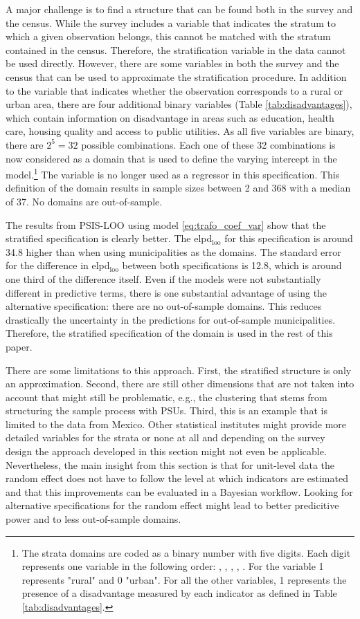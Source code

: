 A major challenge is to find a structure that can be found both in the survey and the census.
While the survey includes a variable that indicates the stratum to which a given observation belongs, this cannot be matched with the stratum contained in the census.
Therefore, the stratification variable in the data cannot be used directly.
However, there are some variables in both the survey and the census that can be used to approximate the stratification procedure.
In addition to the  variable that indicates whether the observation corresponds to a rural or urban area, there are four additional binary variables (Table \ref{tab:disadvantages}), which contain information on disadvantage in areas such as education, health care, housing quality and access to public utilities.
As all five variables are binary, there are $2^5 = 32$ possible combinations.
Each one of these 32 combinations is now considered as a domain that is used to define the varying intercept in the model.\footnote{The strata domains are coded as a binary number with five digits. Each digit represents one variable in the following order: , , , , . For the  variable 1 represents "rural" and 0 "urban". For all the other variables, 1 represents the presence of a disadvantage measured by each indicator as defined in Table \ref{tab:disadvantages}.}
The variable  is no longer used as a regressor in this specification.
This definition of the domain results in sample sizes between 2 and 368 with a median of 37.
No domains are out-of-sample.

The results from PSIS-LOO using model \ref{eq:trafo_coef_var} show that the stratified specification is clearly better. The elpd$_{\text{loo}}$ for this specification is around 34.8 higher than when using  municipalities as the domains.
The standard error for the difference in elpd$_{\text{loo}}$ between both specifications is 12.8, which is around one third of the difference itself.
Even if the models were not substantially different in predictive terms, there is one substantial advantage of using the alternative specification: there are no out-of-sample domains.
This reduces drastically the uncertainty in the predictions for out-of-sample municipalities.
Therefore, the stratified specification of the domain is used in the rest of this paper.

There are some limitations to this approach.
First, the stratified structure is only an approximation.
Second, there are still other dimensions that are not taken into account that might still be problematic, e.g., the clustering that stems from structuring the sample process with PSUs.
Third, this is an example that is limited to the data from Mexico.
Other statistical institutes might provide more detailed variables for the strata or none at all and depending on the survey design the approach developed in this section might not even be applicable.
Nevertheless, the main insight from this section is that for unit-level data the random effect does not have to follow the level at which indicators are estimated and that this improvements can be evaluated in a Bayesian workflow.
Looking for alternative specifications for the random effect might lead to better predicitive power and to less out-of-sample domains.